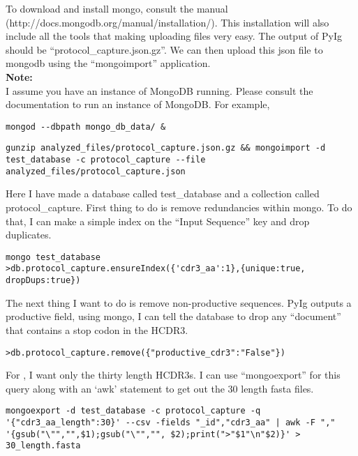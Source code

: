 To download and install mongo, consult the manual \\ (http://docs.mongodb.org/manual/installation/). This installation will also include all the tools that making uploading files very easy. The output of PyIg should be ``protocol\_capture.json.gz''. We can then upload this json file to mongodb using the ``mongoimport'' application. \\

\textbf{Note:} \\
I assume you have an instance of MongoDB running. Please consult the documentation to run an instance of MongoDB. For example,

\begin{lstlisting}[breaklines=true]
mongod --dbpath mongo_db_data/ &
\end{lstlisting}

\begin{lstlisting}[breaklines=true]
gunzip analyzed_files/protocol_capture.json.gz && mongoimport -d test_database -c protocol_capture --file analyzed_files/protocol_capture.json
\end{lstlisting}

Here I have made a database called test\_database and a collection called protocol\_capture. First thing to do is remove redundancies within mongo. To do that, I can make a simple index on the ``Input Sequence'' key and drop duplicates.

\begin{lstlisting}[breaklines=true]
mongo test_database
>db.protocol_capture.ensureIndex({'cdr3_aa':1},{unique:true, dropDups:true})
\end{lstlisting}

The next thing I want to do is remove non-productive sequences. PyIg outputs a productive field, using mongo, I can tell the database to drop any ``document'' that contains a stop codon in the HCDR3.

\begin{lstlisting}[breaklines=true]
>db.protocol_capture.remove({"productive_cdr3":"False"})
\end{lstlisting}

For \rosetta, I want only the thirty length HCDR3s. I can use ``mongoexport'' for this query along with an `awk' statement to get out the 30 length fasta files.

\begin{lstlisting}[breaklines=true]
mongoexport -d test_database -c protocol_capture -q '{"cdr3_aa_length":30}' --csv -fields "_id","cdr3_aa" | awk -F "," '{gsub("\"","",$1);gsub("\"","", $2);print(">"$1"\n"$2)}' > 30_length.fasta
\end{lstlisting}

